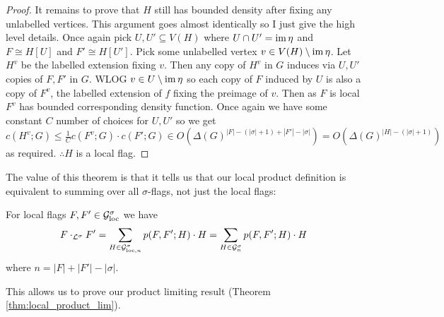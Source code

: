 \begin{proof}
    It remains to prove that $H$ still has bounded density after fixing any unlabelled vertices.
    This argument goes almost identically so I just give the high level details. Once again
    pick $U, U' \subseteq V(H)$ where $U\cap U'=\operatorname{im}\eta$ and $F\cong H[U]$ and $F' \cong H[U']$.
    Pick some unlabelled vertex $v\in V(H)\setminus \operatorname{im}\eta$.
    Let $H^v$ be the labelled extension fixing $v$. Then any copy of $H^v$ in $G$ induces
    via $U, U'$ copies of $F, F'$ in $G$. WLOG $v \in U \setminus \operatorname{im} \eta$ so each copy
    of $F$ induced by $U$ is also a copy of $F^v$, the labelled extension of $f$ fixing the
    preimage of $v$. Then as $F$ is local $F^v$ has bounded corresponding density
    function. Once again we have some constant $C$ number of choices for $U, U'$ so we
    get
    $c(H^v; G) \leq \frac{1}{C} c(F^v; G) \cdot c(F'; G) \in
    O(\Delta(G)^{|F|-(|\sigma|+1)+|F'|-|\sigma|}) = O(\Delta(G)^{|H|-(|\sigma|+1)})$
    as required.  $\therefore H$ is a local flag.
\end{proof}

The value of this theorem is that it tells us that our local product definition is
equivalent to summing over all $\sigma$-flags, not just the local flags:

\begin{corollary}
    \label{corollary:local_product}
    For local flags $F, F' \in \mathcal{G}_\mathrm{loc}^\sigma$ we have
    \[
        F \cdot_{\mathcal{L}^\sigma} F'
        = \sum_{H\in\mathcal{G}_{\mathrm{loc},n}^\sigma}p(F, F'; H)\cdot H
        = \sum_{H\in\mathcal{G}_n^\sigma}p(F, F'; H)\cdot H
    \]
    where $n=|F|+|F'|-|\sigma|$.
\end{corollary}

This allows us to prove our product limiting result (Theorem \ref{thm:local_product_lim}).

